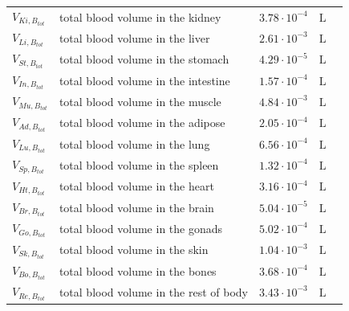 \documentclass[preprint,12pt,authoryear]{elsarticle}
\begin{document}
\begin{longtable}{P{2cm}P{3.5cm}P{2cm}P{1cm}P{2.5cm}}
$V_{Ki,B_{tot}}$ & total blood volume in the kidney & $3.78 \cdot 10^{-4}$ & $\text{L}$ & \citep{brown_1997} \\
$V_{Li,B_{tot}}$ & total blood volume in the liver & $2.61 \cdot 10^{-3}$ & $\text{L}$ & \citep{brown_1997} \\
$V_{St,B_{tot}}$ & total blood volume in the stomach & $4.29 \cdot 10^{-5}$ & $\text{L}$ & \citep{brown_1997} \\
$V_{In,B_{tot}}$ & total blood volume in the intestine & $1.57 \cdot 10^{-4}$ & $\text{L}$ & \citep{brown_1997} \\
$V_{Mu,B_{tot}}$ & total blood volume in the muscle & $4.84 \cdot 10^{-3}$ & $\text{L}$ & \citep{brown_1997} \\
$V_{Ad,B_{tot}}$ & total blood volume in the adipose & $2.05 \cdot 10^{-4}$ & $\text{L}$ & \citep{brown_1997} \\
$V_{Lu,B_{tot}}$ & total blood volume in the lung & $6.56 \cdot 10^{-4}$ & $\text{L}$ & \citep{brown_1997} \\
$V_{Sp,B_{tot}}$ & total blood volume in the spleen & $1.32 \cdot 10^{-4}$ & $\text{L}$ & \citep{brown_1997} \\
$V_{Ht,B_{tot}}$ & total blood volume in the heart & $3.16 \cdot 10^{-4}$ & $\text{L}$ & \citep{brown_1997} \\
$V_{Br,B_{tot}}$ & total blood volume in the brain & $5.04 \cdot 10^{-5}$ & $\text{L}$ & \citep{brown_1997} \\
$V_{Go,B_{tot}}$ & total blood volume in the gonads & $5.02 \cdot 10^{-4}$ & $\text{L}$ & \citep{willmann_2003} \\
$V_{Sk,B_{tot}}$ & total blood volume in the skin & $1.04 \cdot 10^{-3}$ & $\text{L}$ & \citep{brown_1997} \\
$V_{Bo,B_{tot}}$ & total blood volume in the bones & $3.68 \cdot 10^{-4}$ & $\text{L}$ & \citep{brown_1997} \\
$V_{Re,B_{tot}}$ & total blood volume in the rest of body & $3.43 \cdot 10^{-3}$ & $\text{L}$ & \citep{brown_1997} \\
\midrule\midrule


\end{longtable}
\end{document}
